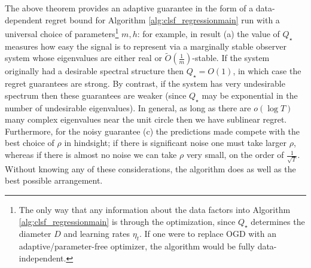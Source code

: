 \documentclass[11pt]{article}
\numberwithin{equation}{section}
\begin{document}
The above theorem provides an adaptive guarantee in the form of a data-dependent regret bound for Algorithm \ref{alg:clsf_regressionmain} run with a universal choice of parameters\footnote{The only way that any information about the data factors into Algorithm \ref{alg:clsf_regressionmain} is through the optimization, since $Q_\star$ determines the diameter $D$ and learning rates $\eta_t$. If one were to replace OGD with an adaptive/parameter-free optimizer, the algorithm would be fully data-independent.} $m, h$: for example, in result (a) the value of $Q_\star$ measures how easy the signal is to represent via a marginally stable observer system whose eigenvalues are either real or $\widetilde{O}\left(\frac{1}{m}\right)$-stable. If the system originally had a desirable spectral structure then $Q_\star = O(1)$, in which case the regret guarantees are strong. By contrast, if the system has very undesirable spectrum then these guarantees are weaker (since $Q_\star$ may be exponential in the number of undesirable eigenvalues). In general, as long as there are $o( \log T)$ many complex eigenvalues near the unit circle then we have sublinear regret. Furthermore, for the noisy guarantee (c) the predictions made compete with the best choice of $\rho$ in hindsight; if there is significant noise one must take larger $\rho$, whereas if there is almost no noise we can take $\rho$ very small, on the order of $\frac{1}{\sqrt{T}}$. Without knowing any of these considerations, the algorithm does as well as the best possible arrangement.

\end{document}
